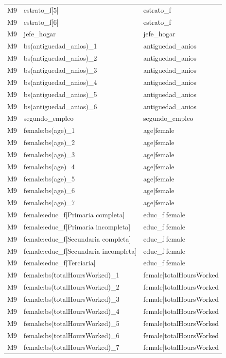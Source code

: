 \begin{longtable}{lll}
M9 & estrato\_f[5] & estrato\_f \\
M9 & estrato\_f[6] & estrato\_f \\
M9 & jefe\_hogar & jefe\_hogar \\
M9 & bs(antiguedad\_anios)\_1 & antiguedad\_anios \\
M9 & bs(antiguedad\_anios)\_2 & antiguedad\_anios \\
M9 & bs(antiguedad\_anios)\_3 & antiguedad\_anios \\
M9 & bs(antiguedad\_anios)\_4 & antiguedad\_anios \\
M9 & bs(antiguedad\_anios)\_5 & antiguedad\_anios \\
M9 & bs(antiguedad\_anios)\_6 & antiguedad\_anios \\
M9 & segundo\_empleo & segundo\_empleo \\
M9 & female:bs(age)\_1 & age|female \\
M9 & female:bs(age)\_2 & age|female \\
M9 & female:bs(age)\_3 & age|female \\
M9 & female:bs(age)\_4 & age|female \\
M9 & female:bs(age)\_5 & age|female \\
M9 & female:bs(age)\_6 & age|female \\
M9 & female:bs(age)\_7 & age|female \\
M9 & female:educ\_f[Primaria completa] & educ\_f|female \\
M9 & female:educ\_f[Primaria incompleta] & educ\_f|female \\
M9 & female:educ\_f[Secundaria completa] & educ\_f|female \\
M9 & female:educ\_f[Secundaria incompleta] & educ\_f|female \\
M9 & female:educ\_f[Terciaria] & educ\_f|female \\
M9 & female:bs(totalHoursWorked)\_1 & female|totalHoursWorked \\
M9 & female:bs(totalHoursWorked)\_2 & female|totalHoursWorked \\
M9 & female:bs(totalHoursWorked)\_3 & female|totalHoursWorked \\
M9 & female:bs(totalHoursWorked)\_4 & female|totalHoursWorked \\
M9 & female:bs(totalHoursWorked)\_5 & female|totalHoursWorked \\
M9 & female:bs(totalHoursWorked)\_6 & female|totalHoursWorked \\
M9 & female:bs(totalHoursWorked)\_7 & female|totalHoursWorked \\

\end{longtable}
